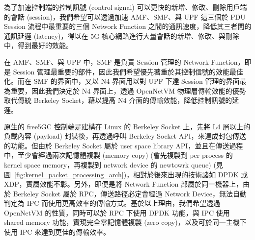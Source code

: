 
為了加速控制端的控制訊號 (control signal) 可以更快的新增、修改、刪除用戶端的會話 (session)，我們希望可以透過加速 AMF、SMF、與 UPF 這三個於 PDU Session 流程中最重要的三個 Network Function 之間的通訊速度，降低其三者間的通訊延遲 (latency)，得以在 5G 核心網路進行大量會話的新增、修改、與刪除中，得到最好的效能。

在 AMF、SMF、與 UPF 中，SMF 是負責 Session 管理的 Network Function，即是 Session 管理最重要的部件，因此我們希望優先著重於其控制信號的效能最佳化。而在 SMF 的界面中，又以 N4 界面用以對 UPF 下達 Session 管理的界面最為重要，因此我們決定於 N4 界面上，透過 OpenNetVM 物理層傳輸效能的優勢取代傳統 Berkeley Socket，藉以提高 N4 介面的傳輸效能，降低控制訊號的延遲。


原生的 free5GC 控制端是建構在 Linux 的 Berkeley Socket 上，先將 L4 層以上的負載內容 (payload) 封裝後，再透過呼叫 Berkeley Socket API，來達成封包傳送的功能。但由於 Berkeley Socket 屬於 user space library API，並且在傳送過程中，至少會經過兩次記憶體複製 (memory copy) (會先複製到 per process 的 kernel space memory，再複製到 network device 的 newtowrk queue) (見圖~\ref{fig:kernel_packet_processing_arch})，相對於後來出現的技術諸如 DPDK 或 XDP，實屬效能不彰。另外，即便是將 Network Function 部屬於同一機器上，由於 Berkeley Socket 屬於 RPC，傳送路徑必定會經過 Network Device，無法自動判定為 IPC 而使用更高效率的傳輸方式。基於以上理由，我們希望透過 OpenNetVM 的性質，同時可以於 RPC 下使用 DPDK 功能，與 IPC 使用 shared memory 功能，實現完全零記憶體複製 (zero copy)，以及可於同一主機下使用 IPC 來達到更佳的傳輸效率。

